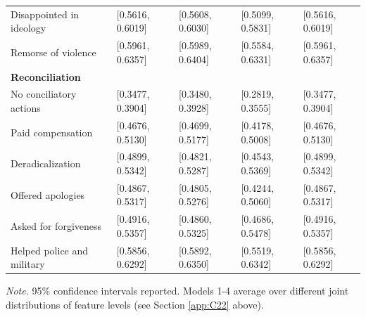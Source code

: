 \begin{table}[H]
\begin{threeparttable}
\begin{tabular}{lllll}
Disappointed in ideology & [0.5616, 0.6019]                     & [0.5608, 0.6030]      & [0.5099, 0.5831]      & [0.5616, 0.6019]\\ 
Remorse of violence      & [0.5961, 0.6357]                     & [0.5989, 0.6404]      & [0.5584, 0.6331]      & [0.5961, 0.6357]\\ [0.9ex]
\textbf{Reconciliation} \\  
No conciliatory actions & [0.3477, 0.3904]                      & [0.3480, 0.3928]      & [0.2819, 0.3555]      & [0.3477, 0.3904]\\ 
Paid compensation & [0.4676, 0.5130]                          & [0.4699, 0.5177]      & [0.4178, 0.5008]      & [0.4676, 0.5130]\\ 
Deradicalization & [0.4899, 0.5342]                 & [0.4821, 0.5287]      & [0.4543, 0.5369]      & [0.4899, 0.5342]\\ 
Offered apologies  &  [0.4867, 0.5317]                     & [0.4805, 0.5276]      & [0.4244, 0.5060]      & [0.4867, 0.5317]\\ 
Asked for forgiveness & [0.4916, 0.5357]                         & [0.4860, 0.5325]      & [0.4686, 0.5478]      & [0.4916, 0.5357]\\ 
Helped police and military & [0.5856, 0.6292]                   & [0.5892, 0.6350]      & [0.5519, 0.6342]      & [0.5856, 0.6292]\\ 
\midrule
\bottomrule
\end{tabular}
\begin{tablenotes}
\footnotesize
\item[]\textit{Note.} 95\% confidence intervals reported. Models 1-4 average over different joint distributions of feature levels (see Section \ref{app:C22} above). 
\end{tablenotes}
\end{threeparttable}
\end{table}

